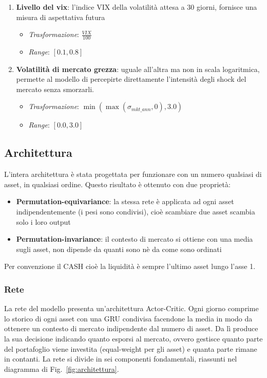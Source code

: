 \begin{enumerate}
\begin{itemize}
  \end{itemize}
    \item \textbf{Livello del vix}: l'indice VIX della volatilità attesa a 30 giorni, fornisce una misura di aspettativa futura
    \begin{itemize}
    \item \textit{Trasformazione}: $\frac{VIX}{100}$
    \item \textit{Range}: $[0.1, 0.8]$
  \end{itemize}
    \item \textbf{Volatilità di mercato grezza}: uguale all'altra ma non in scala logaritmica, permette al modello di percepirte direttamente l'intensità degli shock del mercato senza smorzarli.
    \begin{itemize}
    \item \textit{Trasformazione}: $\min(\max(\sigma_{mkt\_ann},0), 3.0)$
    \item \textit{Range}: $[0.0,3.0]$
  \end{itemize}
\end{enumerate}



\subsection{Architettura}
\label{set:architettura}
L'intera architettura è stata progettata per funzionare con un numero qualsiasi di asset, in qualsiasi ordine. 
Questo risultato è ottenuto con due proprietà:
\begin{itemize}
  \item \textbf{Permutation-equivariance}: la stessa rete è applicata ad ogni asset indipendentemente (i pesi sono condivisi), cioè scambiare due asset scambia solo i loro output
  \item \textbf{Permutation-invariance}: il contesto di mercato si ottiene con una media sugli asset, non dipende da quanti sono nè da come sono ordinati
\end{itemize}

Per convenzione il CASH cioè la liquidità è sempre l'ultimo asset lungo l'asse 1.

\subsubsection{Rete}
La rete del modello presenta un'architettura Actor-Critic. 
Ogni giorno comprime lo storico di ogni asset con una GRU condivisa facendone la media in modo da ottenere un contesto di mercato indipendente dal numero di asset.
Da lì produce la sua decisione indicando quanto esporsi al mercato, ovvero gestisce quanto parte del portafoglio viene investita (equal-weight per gli asset) e quanta parte rimane in contanti. 
La rete si divide in sei componenti fondamentali, riassunti nel diagramma di Fig.~\ref{fig:architettura}.

